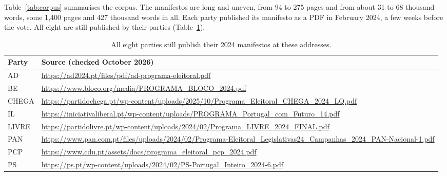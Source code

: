 Table~\ref{tab:corpus} summarises the corpus. The manifestos are long and
uneven, from 94 to 275 pages and from about 31 to 68 thousand words, some
1{,}400 pages and 427 thousand words in all. Each party published its
manifesto as a PDF in February 2024, a few weeks before the vote.
All eight are still published by their parties (Table~\ref{tab:sources}).

\begin{table}[h]
    \centering
    \footnotesize
    \def\UrlBreaks{\do\/\do-\do_}
    \begin{tabular}{|l|p{}|}
        \hline
        \textbf{Party} & \textbf{Source (checked October 2026)} \\
        \hline
        AD    & \url{https://ad2024.pt/files/pdf/ad-programa-eleitoral.pdf} \\
        BE    & \url{https://www.bloco.org/media/PROGRAMA_BLOCO_2024.pdf} \\
        CHEGA & \url{https://partidochega.pt/wp-content/uploads/2025/10/Programa_Eleitoral_CHEGA_2024_LQ.pdf} \\
        IL    & \url{https://iniciativaliberal.pt/wp-content/uploads/PROGRAMA_Portugal_com_Futuro_14.pdf} \\
        LIVRE & \url{https://partidolivre.pt/wp-content/uploads/2024/02/Programa_LIVRE_2024_FINAL.pdf} \\
        PAN   & \url{https://www.pan.com.pt/files/uploads/2024/02/Programa-Eleitoral_Legislativas24_Campanhas_2024_PAN-Nacional-1.pdf} \\
        PCP   & \url{https://www.cdu.pt/assets/docs/programa_eleitoral_pcp_2024.pdf} \\
        PS    & \url{https://ps.pt/wp-content/uploads/2024/02/PS-Portugal_Inteiro_2024-6.pdf} \\
        \hline
    \end{tabular}
    \caption[Manifesto sources]{All eight parties still publish their 2024 manifestos at these addresses.}
    \label{tab:sources}
\end{table}

